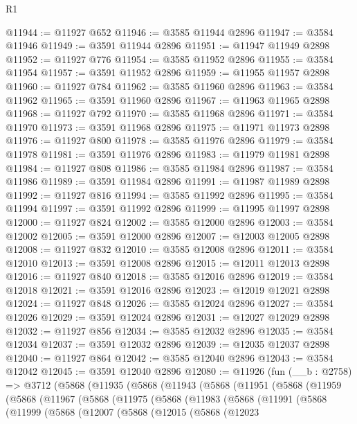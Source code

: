 \begin{lexlean}{R1}
\begin{coremodule}
@11944 := @11927 @652
@11946 := @3585 @11944 @2896
@11947 := @3584 @11946
@11949 := @3591 @11944 @2896
@11951 := @11947 @11949 @2898
@11952 := @11927 @776
@11954 := @3585 @11952 @2896
@11955 := @3584 @11954
@11957 := @3591 @11952 @2896
@11959 := @11955 @11957 @2898
@11960 := @11927 @784
@11962 := @3585 @11960 @2896
@11963 := @3584 @11962
@11965 := @3591 @11960 @2896
@11967 := @11963 @11965 @2898
@11968 := @11927 @792
@11970 := @3585 @11968 @2896
@11971 := @3584 @11970
@11973 := @3591 @11968 @2896
@11975 := @11971 @11973 @2898
@11976 := @11927 @800
@11978 := @3585 @11976 @2896
@11979 := @3584 @11978
@11981 := @3591 @11976 @2896
@11983 := @11979 @11981 @2898
@11984 := @11927 @808
@11986 := @3585 @11984 @2896
@11987 := @3584 @11986
@11989 := @3591 @11984 @2896
@11991 := @11987 @11989 @2898
@11992 := @11927 @816
@11994 := @3585 @11992 @2896
@11995 := @3584 @11994
@11997 := @3591 @11992 @2896
@11999 := @11995 @11997 @2898
@12000 := @11927 @824
@12002 := @3585 @12000 @2896
@12003 := @3584 @12002
@12005 := @3591 @12000 @2896
@12007 := @12003 @12005 @2898
@12008 := @11927 @832
@12010 := @3585 @12008 @2896
@12011 := @3584 @12010
@12013 := @3591 @12008 @2896
@12015 := @12011 @12013 @2898
@12016 := @11927 @840
@12018 := @3585 @12016 @2896
@12019 := @3584 @12018
@12021 := @3591 @12016 @2896
@12023 := @12019 @12021 @2898
@12024 := @11927 @848
@12026 := @3585 @12024 @2896
@12027 := @3584 @12026
@12029 := @3591 @12024 @2896
@12031 := @12027 @12029 @2898
@12032 := @11927 @856
@12034 := @3585 @12032 @2896
@12035 := @3584 @12034
@12037 := @3591 @12032 @2896
@12039 := @12035 @12037 @2898
@12040 := @11927 @864
@12042 := @3585 @12040 @2896
@12043 := @3584 @12042
@12045 := @3591 @12040 @2896
@12080 := @11926
    (fun (__b : @2758) =>
    @3712
      (@5868
        (@11935
          (@5868
            (@11943
              (@5868
                (@11951
                  (@5868
                    (@11959
                      (@5868
                        (@11967
                          (@5868
                            (@11975
                              (@5868
                                (@11983
                                  (@5868
                                    (@11991
                                      (@5868
                                        (@11999
                                          (@5868
                                            (@12007
                                              (@5868
                                                (@12015
                                                  (@5868
                                                    (@12023

\end{coremodule}
\end{lexlean}
